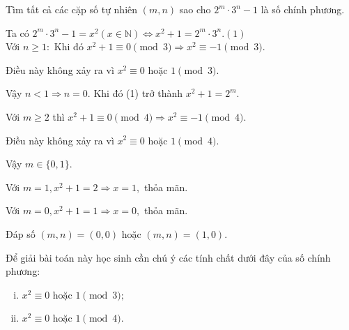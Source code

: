 \begin{bt}%
	Tìm tất cả các cặp số tự nhiên $(m,n)$ sao cho $2^m\cdot 3^n-1$ là số chính phương.
	\loigiai
	{Ta có $2^m\cdot 3^n - 1 = x^2 (x \in \mathbb{N})\Leftrightarrow x^2 + 1 = 2^m\cdot 3^n$.\hfill$(1)$\\
Với $n\geq 1:$ Khi đó $x^2+1\equiv 0\pmod 3 \Rightarrow x^2\equiv -1 \pmod 3.$ 
		
		\noindent  Điều này không xảy ra vì $x^2\equiv 0$  hoặc $1 \pmod 3.$
		
		\noindent Vậy $n<1 \Rightarrow n=0.$
		Khi đó (1) trở thành $x^2+1=2^m.$
		
		\noindent Với $m\geq 2$ thì $x^2+1\equiv 0 \pmod 4 \Rightarrow x^2\equiv - 1\pmod 4.$ 
		
		\noindent  Điều này không xảy ra vì $x^2\equiv 0 \text{ hoặc } 1 \pmod 4.$
		
		\noindent Vậy $m\in \{0,1\}.$
		
		\noindent Với $m=1, x^2+1=2 \Rightarrow x=1,$ thỏa mãn.
		
		\noindent Với $m=0, x^2+1=1 \Rightarrow x=0,$ thỏa mãn.
		
		\noindent Đáp số $(m,n)=(0,0)$ hoặc $(m,n)=(1,0).$
		\begin{nx}
			Để giải bài toán này học sinh cần chú ý các tính chất dưới đây của số chính phương:
			\begin{enumerate}[i)]
				\item $x^2\equiv 0 \text{ hoặc } 1 \pmod 3;$
				\item $x^2\equiv 0 \text{ hoặc } 1 \pmod 4.$
			\end{enumerate}
		\end{nx}
	}
\end{bt}

